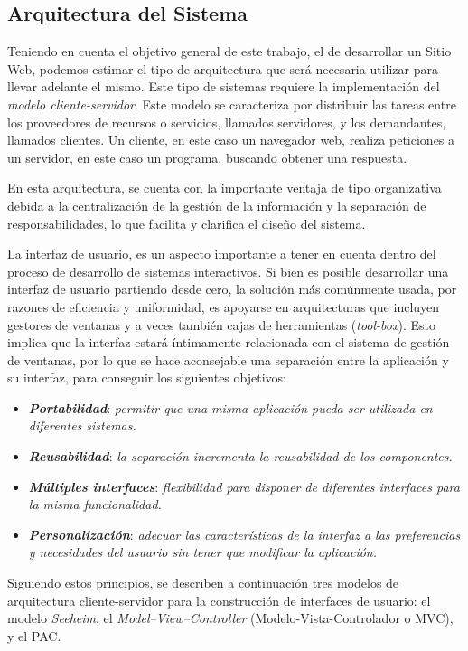 \documentclass[11pt,oneside]{book}
\begin{document}
\subsection{Arquitectura del Sistema}
Teniendo en cuenta el objetivo general de este trabajo, el de desarrollar un Sitio Web, podemos estimar el tipo de arquitectura que será necesaria utilizar para llevar adelante el mismo. Este tipo de sistemas requiere la implementación del \textit{modelo cliente-servidor}. Este modelo se caracteriza por distribuir las tareas entre los proveedores de recursos o servicios, llamados servidores, y los demandantes, llamados clientes. Un cliente, en este caso un navegador web, realiza peticiones a un servidor, en este caso un programa, buscando obtener una respuesta.

En esta arquitectura, se cuenta con la importante ventaja de tipo organizativa debida a la centralización de la gestión de la información y la separación de responsabilidades, lo que facilita y clarifica el diseño del sistema.

La interfaz de usuario, es un aspecto importante a tener en cuenta dentro del proceso de desarrollo de sistemas interactivos. Si bien es posible desarrollar una interfaz de usuario partiendo desde cero, la solución más comúnmente usada, por razones de eficiencia y uniformidad, es apoyarse en arquitecturas que incluyen gestores de ventanas y a veces también cajas de herramientas (\textit{tool-box}). Esto implica que la interfaz estará íntimamente relacionada con el sistema de gestión de ventanas, por lo que se hace aconsejable una separación entre la aplicación y su interfaz, para conseguir los siguientes objetivos:
\begin{itemize}
\item \textit{\textbf{Portabilidad}}: \textit{permitir que una misma aplicación pueda ser utilizada en diferentes sistemas.}
\item \textit{\textbf{Reusabilidad}}: \textit{la separación incrementa la reusabilidad de los componentes.}
\item \textit{\textbf{Múltiples interfaces}}: \textit{flexibilidad para disponer de diferentes interfaces para la misma funcionalidad.}
\item \textit{\textbf{Personalización}}: \textit{adecuar las características de la interfaz a las preferencias y necesidades del usuario sin tener que modificar la aplicación.}
\end{itemize}

Siguiendo estos principios, se describen a continuación tres modelos de arquitectura cliente-servidor para la construcción de interfaces de usuario: el modelo \textit{Seeheim}, el \textit{Model–View–Controller} (Modelo-Vista-Controlador o MVC), y el PAC.
\end{document}
